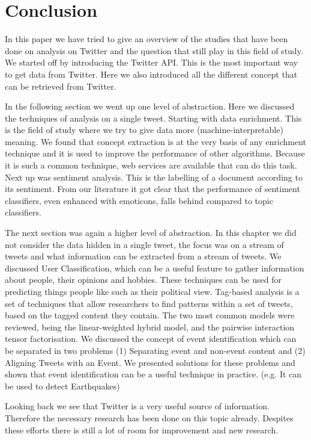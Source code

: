 \documentclass{article}
\begin{document}

\section{Conclusion}
In this paper we have tried to give an overview of the studies that have been done on analysis on Twitter and the question that still play in this field of study. We started off by introducing the Twitter API. This is the most important way to get data from Twitter. Here we also introduced all the different concept that can be retrieved from Twitter. 

In the following section we went up one level of abstraction. Here we discussed the techniques of analysis on a single tweet. Starting with data enrichment. This is the field of study where we try to give data more (machine-interpretable) meaning. We found that concept extraction is at the very basis of any enrichment technique and it is used to improve the performance of other algorithms. Because it is such a common technique, web services are available that can do this task. Next up was sentiment analysis. This is the labelling of a document according to its sentiment. From our literature it got clear that the performance of sentiment classifiers, even enhanced with emoticons, falls behind compared to topic classifiers. 

The next section was again a higher level of abstraction. In this chapter we did not consider the data hidden in a single tweet, the focus was on a stream 
of tweets and what information can be extracted from a stream of tweets. We discussed User Classification, which can be a useful feature to gather information 
about people, their opinions and hobbies. These techniques can be used for predicting things people like such as their political view. Tag-based analysis is
a set of techniques that allow researchers to find patterns within a set of tweets, based on the tagged content they contain. The two most common models
were reviewed, being the linear-weighted hybrid model, and the pairwise interaction tensor factorisation. We discussed the 
concept of event identification which can be separated in two problems (1) Separating event and non-event content and (2) Aligning Tweets with an Event. We presented solutions for these problems and shown that event identification can be a useful technique in practice. (e.g. It can be used to detect Earthquakes)

Looking back we see that Twitter is a very useful source of information. Therefore the necessary research has been done on this topic already. Despites these efforts there is still a lot of room for improvement and new research. 
\newpage


\end{document}
